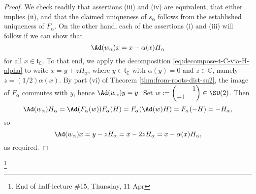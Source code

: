 \documentclass[reqno]{amsart} 
\begin{document}
\begin{proof}
  We check readily that assertions (iii) and (iv) are equivalent, that either implies (ii), and that the claimed uniqueness of $s_\alpha$ follows from the established uniqueness of $F_\alpha$.  On the other hand, each of the assertions (i) and (iii) will follow if we can show that
  \begin{equation}\label{eq:}
    \Ad(w_\alpha) x = x - \alpha(x) H_\alpha 
  \end{equation}
  for all $x \in \mathfrak{t}_{\mathbb{C}}$.  To that end, we apply the decomposition \eqref{eq:decompose-t-C-via-H-alpha} to write $x = y + z H_\alpha$, where $y \in \mathfrak{t}_{\mathbb{C}}$ with $\alpha(y) = 0$ and $z \in \mathbb{C}$, namely $z = (1/2) \alpha(x)$.  By part (vi) of Theorem \ref{thm:from-roots-dist-su2}, the image of $F_\alpha$ commutes with $y$, hence $\Ad(w_\alpha) y = y$.  Set $w := 
\begin{pmatrix}
    & 1 \\
    -1 &
  \end{pmatrix}
 \in \SU(2)$.  Then
  \begin{equation}\label{eq:}
    \Ad(w_\alpha) H_\alpha
    = \Ad(F_\alpha(w)) F_\alpha(H)
    = F_\alpha(\Ad(w) H)
    = F_\alpha(-H) = - H_\alpha,
  \end{equation}
  so
  \begin{equation}\label{eq:}
    \Ad(w_\alpha) x = y - z H_\alpha
    = x - 2 z H_\alpha
    = x - \alpha(x) H_\alpha,
  \end{equation}
  as required.
\end{proof}
\footnote{End of half-lecture \#15, Thursday, 11 Apr}
\end{document}
